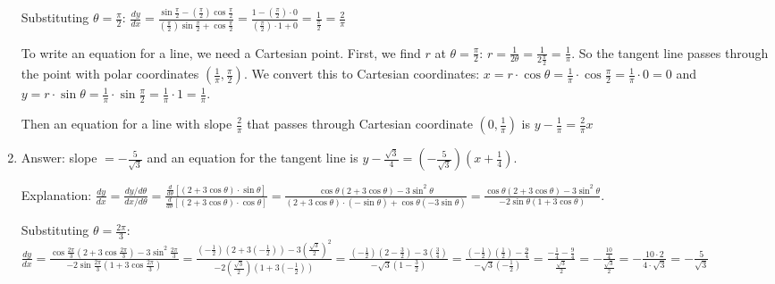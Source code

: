 \begin{Answer}[ref = polar3]
\begin{enumerate}
Substituting $\theta = \frac{\pi}{2}$: $\frac{dy}{dx} = \frac{\sin{\frac{\pi}{
2}} - \left( \frac{\pi}{2}\right) \cos{\frac{\pi}{2}}}{\left( \frac{\pi}{2} 
\right) \sin{\frac{\pi}{2}} + \cos{\frac{\pi}{2}}} = \frac{1 - \left( \frac{
\pi}{2} \right) \cdot 0 }{\left( \frac{\pi}{2} \right) \cdot 1 + 0} = \frac{1}{
\frac{\pi}{2}} = \frac{2}{\pi}$

To write an equation for a line, we need a Cartesian point. First, we find $r$ 
at $\theta = \frac{\pi}{2}$: $r = \frac{1}{2\theta} = \frac{1}{2\frac{\pi}{2}} 
= \frac{1}{\pi}$. So the tangent line passes through the point with polar 
coordinates $\left( \frac{1}{\pi}, \frac{\pi}{2} \right)$. We convert this to 
Cartesian coordinates: $x = r \cdot \cos{\theta} = \frac{1}{\pi} \cdot \cos{
\frac{\pi}{2}} = \frac{1}{\pi} \cdot 0 = 0$ and $y = r \cdot \sin{\theta} = 
\frac{1}{\pi} \cdot \sin{\frac{\pi}{2}} = \frac{1}{\pi} \cdot 1 = \frac{1}{
\pi}$. 

Then an equation for a line with slope $\frac{2}{\pi}$ that passes through 
Cartesian coordinate $\left( 0, \frac{1}{\pi} \right)$ is $y - \frac{1}{\pi} = 
\frac{2}{\pi} x$

\item Answer: slope $= -\frac{5}{\sqrt{3}}$ and an equation for the tangent 
line is $y - \frac{\sqrt{3}}{4} = \left( -\frac{5}{\sqrt{3}} \right) \left( x 
+ \frac{1}{4} \right)$.

Explanation: $\frac{dy}{dx} = \frac{dy/d\theta}{dx/d\theta} = \frac{\frac{d}{d
\theta} \left[ \left( 2 + 3\cos{\theta}\right) \cdot \sin{\theta} \right]}{
\frac{d}{d\theta} \left[ \left( 2 + 3\cos{\theta} \right) \cdot \cos{\theta} 
\right]} = \frac{\cos{\theta} \left( 2 + 3\cos{\theta}\right) - 3\sin^2{\theta}
}{\left( 2 + 3\cos{\theta}\right) \cdot \left(-\sin{\theta} \right) + \cos{
\theta} \left( -3\sin{\theta} \right)} = \frac{\cos{\theta} \left( 2 + 3\cos{
\theta}\right) - 3\sin^2{\theta}}{-2\sin{\theta} \left( 1 + 3\cos{\theta} 
\right)}$. 

Substituting $\theta = \frac{2\pi}{3}$: $\frac{dy}{dx} = \frac{\cos{\frac{2\pi
}{3}} \left( 2 + 3\cos{\frac{2\pi}{3}}\right) - 3\sin^2{\frac{2\pi}{3}}}{-2
\sin{\frac{2\pi}{3}} \left( 1 + 3\cos{\frac{2\pi}{3}}\right)} = \frac{\left( 
-\frac{1}{2} \right) \left( 2 + 3\left( -\frac{1}{2} \right)\right) - 3\left( 
\frac{\sqrt{3}}{2} \right)^2}{-2\left( \frac{\sqrt{3}}{2} \right) \left( 1 + 3
\left( -\frac{1}{2} \right) \right)} = \frac{\left( -\frac{1}{2}\right) \left(2
- \frac{3}{2} \right) - 3\left( \frac{3}{4} \right)}{-\sqrt{3} \left( 1 - 
\frac{3}{2} \right)} = \frac{\left( -\frac{1}{2}\right) \left( \frac{1}{2}
\right) - \frac{9}{4}}{-\sqrt{3} \left( -\frac{1}{2}\right)} = \frac{-\frac{1}{
4} - \frac{9}{4}}{\frac{\sqrt{3}}{2}} = -\frac{\frac{10}{4}}{\frac{\sqrt{3}}{2
}} = -\frac{10 \cdot 2}{4 \cdot \sqrt{3}} = -\frac{5}{\sqrt{3}}$


\end{enumerate}
\end{Answer}
